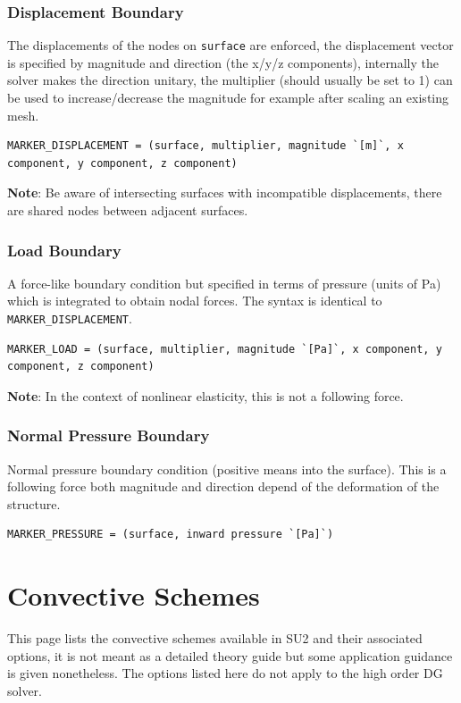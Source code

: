 \documentclass[12pt, a4paper, twoside]{article}
\begin{document}
\subsubsection{Displacement Boundary}


The displacements of the nodes on \verb|surface| are enforced, the displacement vector is specified by magnitude and direction (the x/y/z components), internally the solver makes the direction unitary, the multiplier (should usually be set to 1) can be used to increase/decrease the magnitude for example after scaling an existing mesh.

\begin{lstlisting}
MARKER_DISPLACEMENT = (surface, multiplier, magnitude `[m]`, x component, y component, z component)
\end{lstlisting}


\textbf{Note}: Be aware of intersecting surfaces with incompatible displacements, there are shared nodes between adjacent surfaces.

\subsubsection{Load Boundary}

A force-like boundary condition but specified in terms of pressure (units of Pa) which is integrated to obtain nodal forces. The syntax is identical to \verb|MARKER_DISPLACEMENT|.

\begin{lstlisting}
MARKER_LOAD = (surface, multiplier, magnitude `[Pa]`, x component, y component, z component)
\end{lstlisting}


\textbf{Note}: In the context of nonlinear elasticity, this is not a following force.

\subsubsection{Normal Pressure Boundary}

Normal pressure boundary condition (positive means into the surface). This is a following force both magnitude and direction depend of the deformation of the structure.

\begin{lstlisting}
MARKER_PRESSURE = (surface, inward pressure `[Pa]`)
\end{lstlisting}

\newpage
\section{Convective Schemes}
This page lists the convective schemes available in SU2 and their associated options, it is not meant as a detailed theory guide but some application guidance is given nonetheless. The options listed here do not apply to the high order DG solver.
\end{document}
